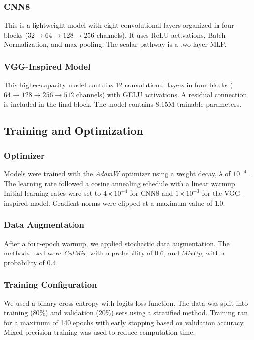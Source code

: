 \subsubsection{CNN8}

This is a lightweight model with eight convolutional layers organized in four blocks ($32\rightarrow64\rightarrow128\rightarrow256$ channels). It uses ReLU activations, Batch Normalization, and max pooling. The scalar pathway is a two-layer MLP.

\subsubsection{VGG-Inspired Model}

This higher-capacity model contains 12 convolutional layers in four blocks ($64\rightarrow128\rightarrow256\rightarrow512$ channels) with GELU activations. A residual connection is included in the final block. The model contains 8.15M trainable parameters.

\subsection{Training and Optimization}

\subsubsection{Optimizer}

Models were trained with the \textit{AdamW} optimizer using a weight decay, $\lambda$ of $10^{-4}$ . The learning rate followed a cosine annealing schedule with a linear warmup. Initial learning rates were set to $4\times10^{-4}$ for CNN8 and $1\times10^{-3}$ for the VGG-inspired model. Gradient norms were clipped at a maximum value of $1.0$.

\subsubsection{Data Augmentation}

After a four-epoch warmup, we applied stochastic data augmentation. The methods used were \textit{CutMix}, with a probability of 0.6, and \textit{MixUp}, with a probability of 0.4.

\subsubsection{Training Configuration}

We used a binary cross-entropy with logits loss function. The data was split into training (80\%) and validation (20\%) sets using a stratified method. Training ran for a maximum of 140 epochs with early stopping based on validation accuracy. Mixed-precision training was used to reduce computation time.

